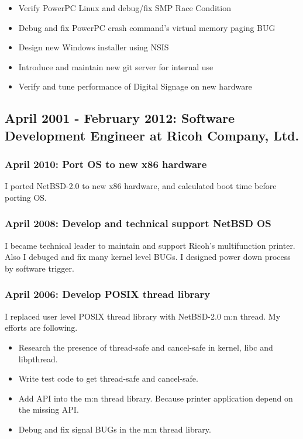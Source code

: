\documentclass[letterpaper]{article}
\begin{document}
\begin{itemize}
  \item Verify PowerPC Linux and debug/fix SMP Race Condition
  \item Debug and fix PowerPC crash command's virtual memory paging BUG
  \item Design new Windows installer using NSIS
  \item Introduce and maintain new git server for internal use
  \item Verify and tune performance of Digital Signage on new hardware
\end{itemize}

\subsection*{April 2001 - February 2012: Software Development Engineer at Ricoh Company, Ltd.}
\subsubsection*{April 2010: Port OS to new x86 hardware}
I ported NetBSD-2.0 to new x86 hardware, and calculated boot time before porting OS.

\subsubsection*{April 2008: Develop and technical support NetBSD OS}
I became technical leader to maintain and support Ricoh's multifunction printer.
Also I debuged and fix many kernel level BUGs.
I designed power down process by software trigger.

\subsubsection*{April 2006: Develop POSIX thread library}
I replaced user level POSIX thread library with NetBSD-2.0 m:n thread.
My efforts are following.
\begin{itemize}
  \item Research the presence of thread-safe and cancel-safe in kernel, libc and libpthread.
  \item Write test code to get thread-safe and cancel-safe.
  \item Add API into the m:n thread library. Because printer application depend on the missing API.
  \item Debug and fix signal BUGs in the m:n thread library.
\end{itemize}
\end{document}
